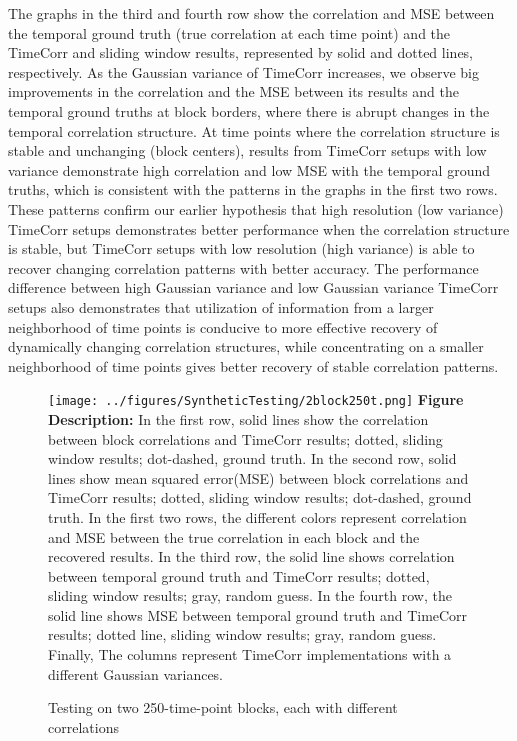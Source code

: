 \documentclass[11pt]{article}
\begin{document}
The graphs in the third and fourth row show the correlation and MSE between the temporal ground truth (true correlation at each time point) and the TimeCorr and sliding window results, represented by solid and dotted lines, respectively. As the Gaussian variance of TimeCorr increases, we observe big improvements in the correlation and the MSE between its results and the temporal ground truths at block borders, where there is abrupt changes in the temporal correlation structure. At time points where the correlation structure is stable and unchanging (block centers), results from TimeCorr setups with low variance demonstrate high correlation and low MSE with the temporal ground truths, which is consistent with the patterns in the graphs in the first two rows. These patterns confirm our earlier hypothesis that high resolution (low variance) TimeCorr setups demonstrates better performance when the correlation structure is stable, but TimeCorr setups with low resolution (high variance) is able to recover changing correlation patterns with better accuracy. The performance difference between high Gaussian variance and low Gaussian variance TimeCorr setups also demonstrates that utilization of information from a larger neighborhood of time points is conducive to more effective recovery of dynamically changing correlation structures, while concentrating on a smaller neighborhood of time points gives better recovery of stable correlation patterns.

\begin{figure}[!htb]
\caption{Testing on two 250-time-point blocks, each with different correlations}
\texttt{[image: ../figures/SyntheticTesting/2block250t.png]}
\label{fig:2block250t}
\small{\textbf{Figure Description:} In the first row, solid lines show the correlation between block correlations and TimeCorr results; dotted, sliding window results; dot-dashed, ground truth. In the second row, solid lines show mean squared error(MSE) between block correlations and TimeCorr results; dotted, sliding window results; dot-dashed, ground truth. In the first two rows, the different colors represent correlation and MSE between the true correlation in each block and the recovered results. In the third row, the solid line shows correlation between temporal ground truth and TimeCorr results; dotted, sliding window results; gray, random guess. In the fourth row, the solid line shows MSE between temporal ground truth and TimeCorr results; dotted line, sliding window results; gray, random guess. Finally, The columns represent TimeCorr implementations with a different Gaussian variances.}
\end{figure}
\end{document}
